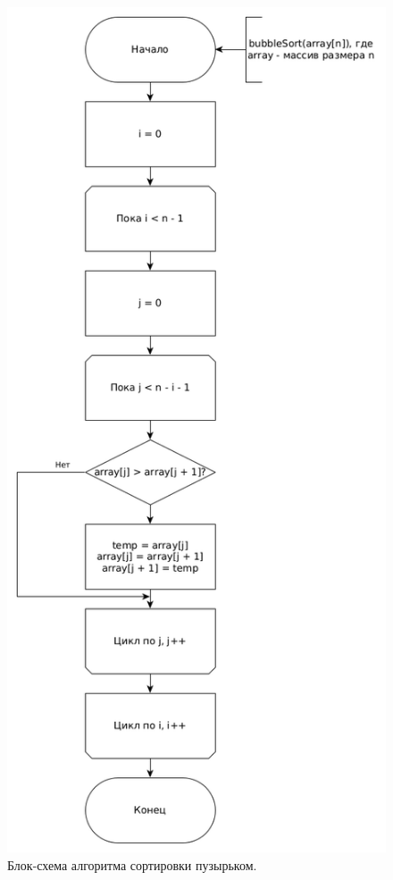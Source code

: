 \documentclass[12pt]{report}
\begin{document}
\begin{figure}
\begin{center}
\includegraphics[scale=0.4]{inc/img/bubbleSort.png}
\captionsetup{justification=centering}
	\caption{Блок-схема алгоритма сортировки пузырьком.}
	\label{img:bubbleSortScheme}	
\end{center}
\end{figure}
\end{document}
